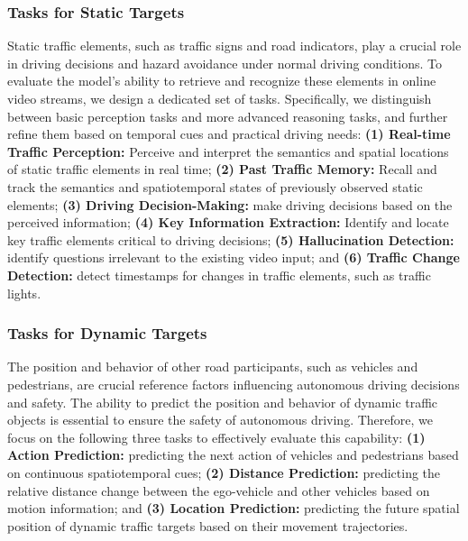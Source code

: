 

\subsubsection{Tasks for Static Targets}
Static traffic elements, such as traffic signs and road indicators, play a crucial role in driving decisions and hazard avoidance under normal driving conditions. To evaluate the model’s ability to retrieve and recognize these elements in online video streams, we design a dedicated set of tasks. Specifically, we distinguish between basic perception tasks and more advanced reasoning tasks, and further refine them based on temporal cues and practical driving needs: \textbf{(1) Real-time Traffic Perception:} Perceive and interpret the semantics and spatial locations of static traffic elements in real time; \textbf{(2) Past Traffic Memory:} Recall and track the semantics and spatiotemporal states of previously observed static elements; \textbf{(3) Driving Decision-Making:} make driving decisions based on the perceived information; \textbf{(4) Key Information Extraction:} Identify and locate key traffic elements critical to driving decisions; \textbf{(5) Hallucination Detection:} identify questions irrelevant to the existing video input; and \textbf{(6) Traffic Change Detection:} detect timestamps for changes in traffic elements, such as traffic lights.



\subsubsection{Tasks for Dynamic Targets}
The position and behavior of other road participants, such as vehicles and pedestrians, are crucial reference factors influencing autonomous driving decisions and safety. The ability to predict the position and behavior of dynamic traffic objects is essential to ensure the safety of autonomous driving. Therefore, we focus on the following three tasks to effectively evaluate this capability: \textbf{(1) Action Prediction:} predicting the next action of vehicles and pedestrians based on continuous spatiotemporal cues; \textbf{(2) Distance Prediction:} predicting the relative distance change between the ego-vehicle and other vehicles based on motion information; and \textbf{ (3) Location Prediction:} predicting the future spatial position of dynamic traffic targets based on their movement trajectories.


